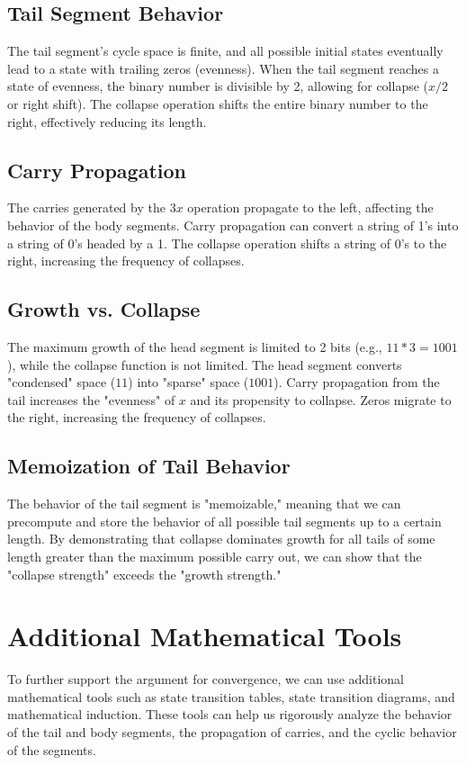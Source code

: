 \documentclass{article}
\begin{document}
\subsection{Tail Segment Behavior}
The tail segment's cycle space is finite, and all possible initial states eventually lead to a state with trailing zeros (evenness). When the tail segment reaches a state of evenness, the binary number is divisible by 2, allowing for collapse ($x/2$ or right shift). The collapse operation shifts the entire binary number to the right, effectively reducing its length.

\subsection{Carry Propagation}
The carries generated by the $3x$ operation propagate to the left, affecting the behavior of the body segments. Carry propagation can convert a string of 1's into a string of 0's headed by a 1. The collapse operation shifts a string of 0's to the right, increasing the frequency of collapses.

\subsection{Growth vs. Collapse}
The maximum growth of the head segment is limited to 2 bits (e.g., $11 * 3 = 1001$), while the collapse function is not limited. The head segment converts "condensed" space ($11$) into "sparse" space ($1001$). Carry propagation from the tail increases the "evenness" of $x$ and its propensity to collapse. Zeros migrate to the right, increasing the frequency of collapses.

\subsection{Memoization of Tail Behavior}
The behavior of the tail segment is "memoizable," meaning that we can precompute and store the behavior of all possible tail segments up to a certain length. By demonstrating that collapse dominates growth for all tails of some length greater than the maximum possible carry out, we can show that the "collapse strength" exceeds the "growth strength."

\section{Additional Mathematical Tools}
To further support the argument for convergence, we can use additional mathematical tools such as state transition tables, state transition diagrams, and mathematical induction. These tools can help us rigorously analyze the behavior of the tail and body segments, the propagation of carries, and the cyclic behavior of the segments.
\end{document}
